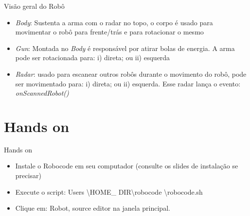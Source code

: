 \begin{frame}
	\begin{block}{Visão geral do Robô}
		\begin{itemize}
			\item \emph{Body}: Sustenta a arma com o radar no topo, o corpo é usado para movimentar o robô para frente/trás e para rotacionar o mesmo
			
			\item \emph{Gun}: Montada no \emph{Body} é responsável por atirar bolas de energia. A arma pode ser rotacionada para: i) direta; ou ii) esquerda

			\item \emph{Radar}: usado para escanear outros robôs durante o movimento do robô, pode ser movimentado para: i) direta; ou ii) esquerda. Esse radar lança o evento:  \emph{onScannedRobot()}  \citep{ROBOWIKI}
						
		\end{itemize}
	\end{block}
\end{frame}


\section{Hands on}

\begin{frame}
	\begin{block}{Hands on}
		\begin{itemize}
			\item Instale o Robocode em seu computador (consulte os slides de instalação se precisar)
			
			\item Execute o script:  Users \textbackslash HOME\_ DIR\textbackslash robocode \textbackslash robocode.sh
			
			\item Clique em: Robot, source editor na janela principal.
		\end{itemize}
	\end{block}
\end{frame}


